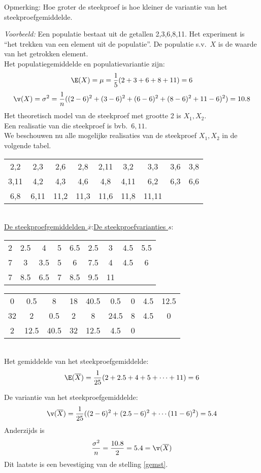 {{\sc Opmerking:} Hoe groter de  steekproef is hoe kleiner de variantie van het steekproefgemiddelde.

{\em Voorbeeld:} \label{schatter} Een populatie bestaat uit de getallen 2,3,6,8,11. Het experiment is ``het trekken van een element uit de populatie''. De populatie s.v.\ $X$ is de waarde van het getrokken element. \\
Het populatiegemiddelde en populatievariantie zijn:
$$\E(X)=\mu=\frac{1}{5}(2+3+6+8+11)=6$$
$$\v(X)=\sigma^2=\frac{1}{n}((2-6)^2+(3-6)^2+(6-6)^2+(8-6)^2+11-6)^2)=10.8$$
 Het theoretisch model van de steekproef met grootte 2 is $X_1,X_2$.\\
Een realisatie van die steekproef is bvb.\ $6,11$.\\
 We beschouwen nu alle mogelijke realisaties van de steekproef $X_1,X_2$ in de volgende tabel.\\ 
\begin{tabular}{ccccccccc}
2,2& 2,3 &  2,6 & 2,8 & 2,11 & 3,2& 3,3 &  3,6 & 3,8\\
 3,11 &4,2& 4,3 &  4,6 & 4,8 & 4,11 &6,2& 6,3 &  6,6\\
 6,8 & 6,11 &11,2& 11,3 &  11,6 & 11,8 & 11,11& &
\end{tabular}\\
\underline{De steekproefgemiddelden $\overline{x}$}:\hfill \underline{De steekproefvarianties $s$}:\\
\begin{tabular}{ccccccccc|}
2& 2.5 &  4 & 5 & 6.5 & 2.5& 3 &  4.5 & 5.5\\
 7 & 3& 3.5 &  5 & 6 & 7.5 & 4& 4.5 &  6\\
 7 & 8.5 & 6.5& 7 &  8.5 & 9.5 & 11& &
\end{tabular}
\begin{tabular}{ccccccccc}
0& 0.5 &  8 & 18 & 40.5 & 0.5& 0 &  4.5 & 12.5\\
 32 & 2& 0.5 &  2 & 8 & 24.5 & 8& 4.5 &  0\\
 2 & 12.5 & 40.5& 32 &  12.5 & 4.5 & 0& &
\end{tabular}\\
Het gemiddelde van het steekproefgemiddelde:
$$\E(\overline{X})=\frac{1}{25}(2+2.5+4+5+\cdots +11)=6$$

De variantie van het steekproefgemiddelde:
$$\v(\overline{X})=\frac{1}{25}((2-6)^2+(2.5-6)^2+\cdots (11-6)^2)=5.4$$
Anderzijds is $$\frac{\sigma^2}{n}=\frac{10.8}{2}=5.4=\v(\overline{X})$$
Dit laatste is een bevestiging van de stelling \ref{gemst}.


}
